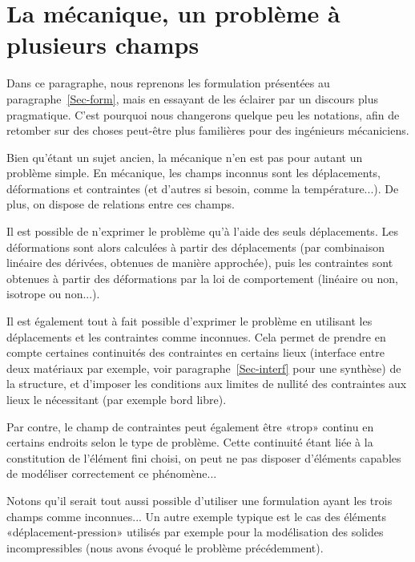

\medskip
\section{La mécanique, un problème à plusieurs champs}\label{Sec-champs}

Dans ce paragraphe, nous reprenons les formulation présentées au paragraphe~\ref{Sec-form}, mais en essayant de les éclairer par un discours plus pragmatique. C'est pourquoi nous changerons quelque peu les notations, afin de retomber sur des choses peut-être plus familières pour des ingénieurs mécaniciens.

\medskip
Bien qu'étant un sujet ancien, la mécanique n'en est pas pour autant un problème simple. En mécanique, les champs inconnus sont les déplacements, déformations et contraintes (et d'autres si besoin, comme la température...). De plus, on dispose de relations entre ces champs.

\medskip
Il est possible de n'exprimer le problème qu'à l'aide des seuls déplacements. Les déformations sont alors calculées à partir des déplacements (par combinaison linéaire des dérivées, obtenues de manière approchée), puis les contraintes sont obtenues à partir des déformations par la loi de comportement (linéaire ou non, isotrope ou non...).

\medskip
Il est également tout à fait possible d'exprimer le problème en utilisant les déplacements et les contraintes comme inconnues. Cela permet de prendre en compte certaines continuités des contraintes en certains lieux (interface entre deux matériaux par exemple, voir paragraphe~\ref{Sec-interf} pour une synthèse) de la structure, et d'imposer les conditions aux limites de nullité des contraintes aux lieux le nécessitant (par exemple bord libre).

Par contre, le champ de contraintes peut également être «trop» continu en certains endroits selon le type de problème. Cette continuité étant liée à la constitution de l'élément fini choisi, on peut ne pas disposer d'éléments capables de modéliser correctement ce phénomène...

\medskip
Notons qu'il serait tout aussi possible d'utiliser une formulation ayant les trois champs comme inconnues...
Un autre exemple typique est le cas des éléments «déplacement-pression» utilisés par exemple pour la modélisation des solides incompressibles (nous avons évoqué le problème précédemment).

